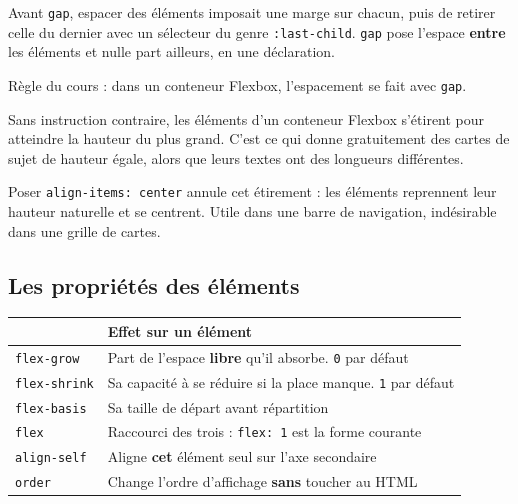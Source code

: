 \documentclass[a4paper,11pt]{article}
\newcommand{\hdr}[1]{\multicolumn{1}{l}{\color{white}\bfseries #1}}
\renewcommand{\arraystretch}{1.3}
\begin{document}
\begin{tcolorbox}[astuce, title={\texttt{gap} plutôt que \texttt{margin}}]
Avant \texttt{gap}, espacer des éléments imposait une marge sur chacun, puis de retirer celle du dernier avec un sélecteur du genre \texttt{:last-child}. \texttt{gap} pose l'espace \textbf{entre} les éléments et nulle part ailleurs, en une déclaration.

\vspace{3pt}
Règle du cours : dans un conteneur Flexbox, l'espacement se fait avec \texttt{gap}.
\end{tcolorbox}

\begin{tcolorbox}[attention, title={\texttt{align-items: stretch}, le comportement par défaut}]
Sans instruction contraire, les éléments d'un conteneur Flexbox s'étirent pour atteindre la hauteur du plus grand. C'est ce qui donne gratuitement des cartes de sujet de hauteur égale, alors que leurs textes ont des longueurs différentes.

\vspace{3pt}
Poser \texttt{align-items: center} annule cet étirement : les éléments reprennent leur hauteur naturelle et se centrent. Utile dans une barre de navigation, indésirable dans une grille de cartes.
\end{tcolorbox}

\subsection{Les propriétés des éléments}

\begin{center}
\renewcommand{\arraystretch}{1.0}
\begin{tabularx}{\linewidth}{p{3.2cm}X}
  \toprule
  \rowcolor{uniNavy}
  \hdr{Propriété} & \hdr{Effet sur un élément} \\
  \midrule
  \rowcolor{uniPaper}
  \texttt{flex-grow} & Part de l'espace \textbf{libre} qu'il absorbe. \texttt{0} par défaut \\
  \texttt{flex-shrink} & Sa capacité à se réduire si la place manque. \texttt{1} par défaut \\
  \rowcolor{uniPaper}
  \texttt{flex-basis} & Sa taille de départ avant répartition \\
  \texttt{flex} & Raccourci des trois : \texttt{flex: 1} est la forme courante \\
  \rowcolor{uniPaper}
  \texttt{align-self} & Aligne \textbf{cet} élément seul sur l'axe secondaire \\
  \texttt{order} & Change l'ordre d'affichage \textbf{sans} toucher au HTML \\
  \bottomrule
\end{tabularx}
\end{center}
\end{document}
